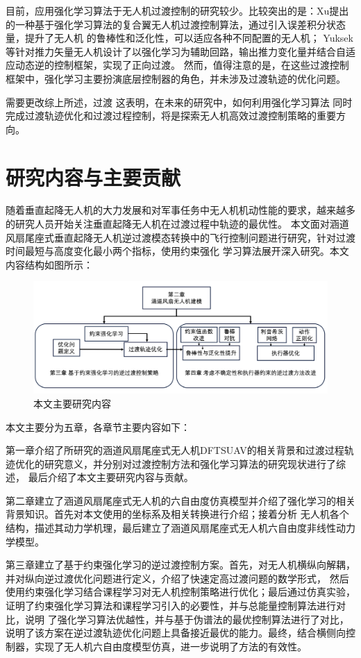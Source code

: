 目前，应用强化学习算法于无人机过渡控制的研究较少。比较突出的是：Xu提出的一种基于强化学习算法的复合翼无人机过渡控制算法，通过引入误差积分状态量，提升了无人机
的鲁棒性和泛化性，可以适应各种不同配置的无人机\cite{xu2019learning}；
Yuksek等针对推力矢量无人机设计了以强化学习为辅助回路，输出推力变化量并结合自适应动态逆的控制框架，实现了正向过渡\cite{yuksek2022transition}。
然而，值得注意的是，在这些过渡控制框架中，强化学习主要扮演底层控制器的角色，并未涉及过渡轨迹的优化问题。

需要更改综上所述，过渡
这表明，在未来的研究中，如何利用强化学习算法
同时完成过渡轨迹优化和过渡过程控制，将是探索无人机高效过渡控制策略的重要方向。
\section{研究内容与主要贡献}
随着垂直起降无人机的大力发展和对军事任务中无人机机动性能的要求，越来越多的研究人员开始关注垂直起降无人机在过渡过程中轨迹的最优性。
本文面对涵道风扇尾座式垂直起降无人机逆过渡模态转换中的飞行控制问题进行研究，针对过渡时间最短与高度变化最小两个指标，使用约束强化
学习算法展开深入研究。本文内容结构如图所示：
\begin{figure}[htbp]
    \centering
    \includegraphics[width=1.0\textwidth]{figure/chapter1/主要研究内容.png}
    \caption{\label{fig:architecture}本文主要研究内容}
\end{figure}

本文主要分为五章，各章节主要内容如下：

第一章介绍了所研究的涵道风扇尾座式无人机DFTSUAV的相关背景和过渡过程轨迹优化的研究意义，并分别对过渡控制方法和强化学习算法的研究现状进行了综述，
最后介绍了本文主要研究内容与贡献。

第二章建立了涵道风扇尾座式无人机的六自由度仿真模型并介绍了强化学习的相关背景知识。首先对本文使用的坐标系及相关转换进行介绍；接着分析
无人机各个结构，描述其动力学机理，最后建立了涵道风扇尾座式无人机六自由度非线性动力学模型。

第三章建立了基于约束强化学习的逆过渡控制方案。首先，对无人机横纵向解耦，并对纵向逆过渡优化问题进行定义，介绍了快速定高过渡问题的数学形式，
然后使用约束强化学习结合课程学习对无人机控制策略进行优化；最后通过仿真实验，证明了约束强化学习算法和课程学习引入的必要性，并与总能量控制算法进行对比，说明
了强化学习算法优越性，并与基于伪谱法的最优控制算法进行了对比，说明了该方案在逆过渡轨迹优化问题上具备接近最优的能力。最终，结合横侧向控
制器，实现了无人机六自由度模型仿真，进一步说明了方法的有效性。


